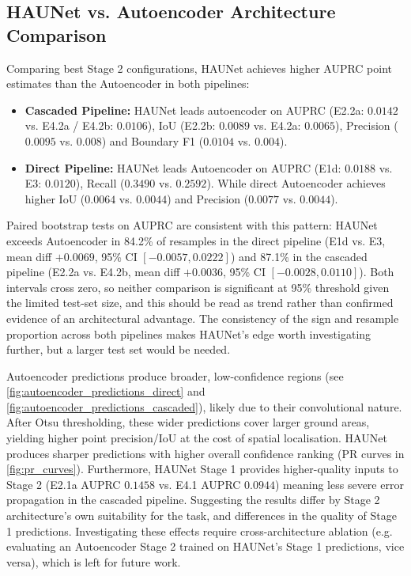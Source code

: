 \documentclass[a4paper, 11pt]{article} %
\begin{document}
\subsection{HAUNet vs. Autoencoder Architecture Comparison}
Comparing best Stage 2 configurations, HAUNet achieves higher AUPRC point estimates than the Autoencoder in both pipelines:
\begin{itemize}
    \item \textbf{Cascaded Pipeline:} HAUNet leads autoencoder on AUPRC (E2.2a: $0.0142$ vs. E4.2a / E4.2b: $0.0106$), IoU (E2.2b: $0.0089$ vs. E4.2a: $0.0065$), Precision ($0.0095$ vs. $0.008$) and Boundary F1 ($0.0104$ vs. $0.004$).
    \item \textbf{Direct Pipeline:} HAUNet leads Autoencoder on AUPRC (E1d: $0.0188$ vs. E3: $0.0120$), Recall ($0.3490$ vs. $0.2592$). While direct Autoencoder achieves higher IoU ($0.0064$ vs. $0.0044$) and Precision ($0.0077$ vs. $0.0044$).
\end{itemize}

Paired bootstrap tests on AUPRC are consistent with this pattern: HAUNet exceeds Autoencoder in 84.2\% of resamples in the direct pipeline (E1d vs. E3, mean diff $+0.0069$, 95\% CI $[-0.0057, 0.0222]$) and 87.1\% in the cascaded pipeline (E2.2a vs. E4.2b, mean diff $+0.0036$, 95\% CI $[-0.0028, 0.0110]$). Both intervals cross zero, so neither comparison is significant at 95\% threshold given the limited test-set size, and this should be read as trend rather than confirmed evidence of an architectural advantage. The consistency of the sign and resample proportion across both pipelines makes HAUNet's edge worth investigating further, but a larger test set would be needed.

Autoencoder predictions produce broader, low-confidence regions (see \ref{fig:autoencoder_predictions_direct} and \ref{fig:autoencoder_predictions_cascaded}), likely due to their convolutional nature. After Otsu thresholding, these wider predictions cover larger ground areas, yielding higher point precision/IoU at the cost of spatial localisation. HAUNet produces sharper predictions with higher overall confidence ranking (PR curves in \ref{fig:pr_curves}). Furthermore, HAUNet Stage 1 provides higher-quality inputs to Stage 2 (E2.1a AUPRC $0.1458$ vs. E4.1 AUPRC $0.0944$) meaning less severe error propagation in the cascaded pipeline. Suggesting the results differ by Stage 2 architecture's own suitability for the task, and differences in the quality of Stage 1 predictions. Investigating these effects require cross-architecture ablation (e.g. evaluating an Autoencoder Stage 2 trained on HAUNet's Stage 1 predictions, vice versa), which is left for future work.
\end{document}
